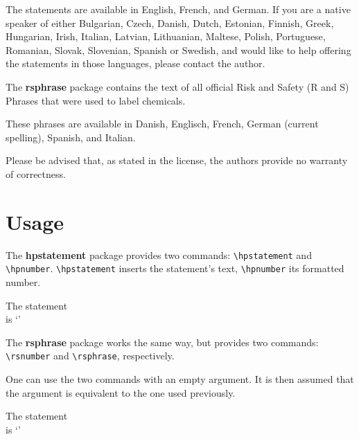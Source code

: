 \documentclass[a4paper,notitlepage,parskip=half]{scrreprt}
\begin{document}
The statements are available in
  English,
  French,
  and
  German.
If you are a native speaker of either
Bulgarian,
Czech,
Danish,
Dutch,
Estonian,
Finnish,
Greek,
Hungarian,
Irish,
Italian,
Latvian,
Lithuanian,
Maltese,
Polish,
Portuguese,
Romanian,
Slovak,
Slovenian,
Spanish or
Swedish,
and would like to help offering the statements in those languages, please
contact the author.

\bigskip

The \textbf{rsphrase} package contains the text of all official
Risk and Safety (R and S) Phrases that were used to label chemicals.

These phrases are
available in Danish, Englisch, French, German (current spelling), Spanish, and
Italian.

\bigskip

Please be advised that, as stated in the license, the authors provide no
warranty of correctness.


\section{Usage}

The \textbf{hpstatement} package provides two commands: \verb|\hpstatement| and
\verb|\hpnumber|. \verb|\hpstatement| inserts the statement's text,
\verb|\hpnumber| its formatted number.\bigskip

\begin{addmargin}[1em]{0em}
\begin{SideBySideExample}[xrightmargin=7cm]
  The statement \\
  is `'
\end{SideBySideExample}
\end{addmargin}
\bigskip

\noindent The \textbf{rsphrase} package works the same way, but provides two
commands: \verb|\rsnumber| and \verb|\rsphrase|, respectively.

\bigskip

\noindent One can use the two commands with an empty argument. It is then
assumed that the argument is equivalent to the one used previously. \bigskip

\begin{addmargin}[1em]{0em}
\begin{SideBySideExample}[xrightmargin=7cm]
  The statement \\
  is `\hpstatement{}'
\end{SideBySideExample}
\end{addmargin}
\bigskip
\end{document}
